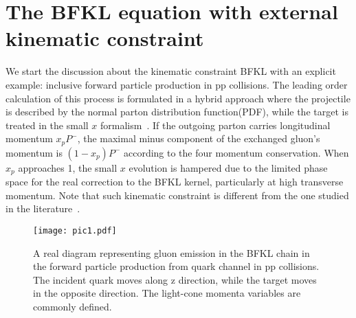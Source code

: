 \documentclass[prd,aps,preprint,tightenlines,nofootinbib,superscriptaddress]{revtex4}
\begin{document}
  

\section{The BFKL equation with external kinematic constraint}
We start the discussion about the kinematic constraint BFKL with an explicit example: inclusive forward particle production in pp collisions.  The leading order calculation of this process  is formulated in a hybrid approach where the projectile is described by the normal parton distribution function(PDF), while the  target is treated  in the small $x$ formalism~\cite{Dumitru:2001jn}. If the outgoing parton carries longitudinal momentum $x_p P^-$, the maximal minus component of the exchanged gluon's momentum is  $(1-x_p)P^-$  according to the four momentum conservation. When $x_p$ approaches  1, the small $x$ evolution  is hampered due to the limited phase space for the real correction to the BFKL kernel, particularly at high transverse momentum.  Note that such kinematic constraint  is different from the one studied in the literature~\cite{Ciafaloni:1987ur,Catani:1989yc,Andersson:1995ju,Kwiecinski:1996td,Kwiecinski:1997ee}. 

\begin{figure}[htbp]
\texttt{[image: pic1.pdf]}
\caption{ A  real diagram representing gluon emission in the BFKL chain  in the forward particle production from quark channel in pp  collisions. The incident quark moves along z direction, while the target moves in the opposite direction. The light-cone momenta variables are commonly defined. } 
\label{illustration}
\end{figure}
\end{document}
